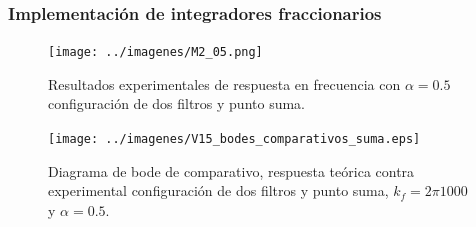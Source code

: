 \documentclass[10pt]{beamer}
\begin{document}
	\begin{frame}
		\frametitle{Implementación de integradores fraccionarios}
		\begin{minipage}[t]{0.45\textwidth}
			\begin{figure}[!ht] 
		\caption{Resultados experimentales de respuesta en frecuencia con $\alpha = 0.5$ configuración de dos filtros y punto suma.}
		\label{fig:M2_05}
		\centering
		\texttt{[image: ../imagenes/M2\_05.png]}
	\end{figure}	
		\end{minipage} \hfill \begin{minipage}[t]{0.45\textwidth}
			\begin{figure}[!ht]
		\caption{Diagrama de bode de comparativo, respuesta teórica contra experimental configuración de dos filtros y punto suma,  $k_{f} = 2\pi 1000$ y  $\alpha = 0.5$.} 
		\label{fig:V15_bodes_comparativos_suma}
		\centering
		\texttt{[image: ../imagenes/V15\_bodes\_comparativos\_suma.eps]}
	\end{figure}
		\end{minipage}
	\end{frame}
\end{document}
